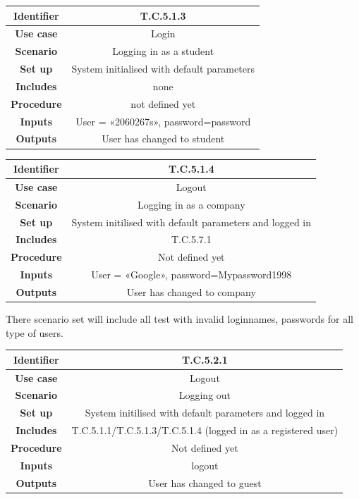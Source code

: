 \documentclass{l3deliverable}
\begin{document}
\begin{tabular}{|c|c|}
\hline \textbf{Identifier} & T.C.5.1.3\\
\hline \textbf{Use case} & Login \\
\hline \textbf{Scenario} & Logging in as a student\\
\hline \textbf{Set up} & System initialised with default parameters\\
\hline \textbf{Includes} & none\\
\hline \textbf{Procedure} & not defined yet\\
\hline \textbf{Inputs} & User = «2060267s», password=password\\
\hline \textbf{Outputs} & User has changed to student\\
\hline
\end{tabular}

\begin{tabular}{|c|c|}
\hline \textbf{Identifier} & T.C.5.1.4 \\
\hline \textbf{Use case} & Logout \\
\hline \textbf{Scenario} & Logging in as a company\\
\hline \textbf{Set up} & System initilised with default parameters and logged in\\
\hline \textbf{Includes} & T.C.5.7.1\\
\hline \textbf{Procedure} & Not defined yet\\
\hline \textbf{Inputs} & User = «Google», password=Mypassword1998\\
\hline \textbf{Outputs} & User has changed to company\\
\hline
\end{tabular}

There scenario set will include all test with invalid loginnames, passwords for all type of users.\\

\begin{tabular}{|c|c|}
\hline \textbf{Identifier} & T.C.5.2.1 \\
\hline \textbf{Use case} & Logout \\
\hline \textbf{Scenario} & Logging out\\
\hline \textbf{Set up} & System initilised with default parameters and logged in\\
\hline \textbf{Includes} & T.C.5.1.1/T.C.5.1.3/T.C.5.1.4 (logged in as a registered user)\\
\hline \textbf{Procedure} & Not defined yet\\
\hline \textbf{Inputs} & logout\\
\hline \textbf{Outputs} & User has changed to guest\\
\hline
\end{tabular}
\end{document}
